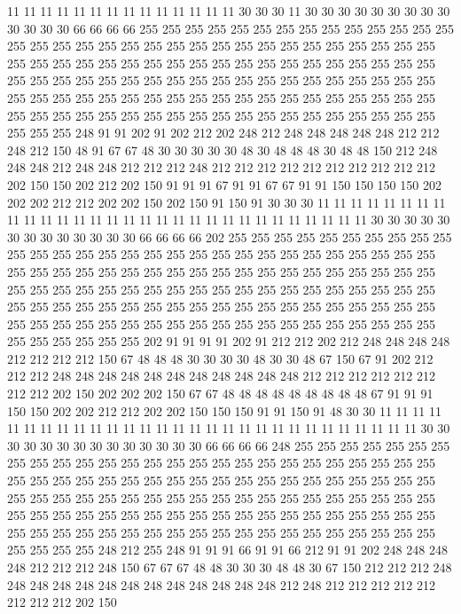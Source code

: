 11 11 11 11 11 11 11 11 11 11 11 11 11 11 30 30 30 11 30 30
30 30 30 30 30 30 30 30 30 30 30 66 66 66 66 255 255 255 255 255
255 255 255 255 255 255 255 255 255 255 255 255 255 255 255 255 255 255 255 255
255 255 255 255 255 255 255 255 255 255 255 255 255 255 255 255 255 255 255 255
255 255 255 255 255 255 255 255 255 255 255 255 255 255 255 255 255 255 255 255
255 255 255 255 255 255 255 255 255 255 255 255 255 255 255 255 255 255 255 255
255 255 255 255 255 255 255 255 255 255 255 255 255 255 255 255 255 255 255 255
255 255 255 255 255 255 255 248 91 91 202 91 202 212 202 248 212 248 248 248
248 248 212 212 248 212 150 48 91 67 67 48 30 30 30 30 30 48 30 48
48 48 30 48 48 150 212 248 248 248 212 248 248 212 212 212 248 212 212 212
212 212 212 212 212 212 212 202 150 150 202 212 202 150 91 91 91 67 91 91
67 67 91 91 150 150 150 150 202 202 202 212 212 202 202 150 202 150 91 150
91 30 30 30 11 11 11 11 11 11 11 11 11 11 11 11 11 11 11 11
11 11 11 11 11 11 11 11 11 11 11 11 11 11 30 30 30 30 30 30
30 30 30 30 30 30 30 66 66 66 66 202 255 255 255 255 255 255 255 255
255 255 255 255 255 255 255 255 255 255 255 255 255 255 255 255 255 255 255 255
255 255 255 255 255 255 255 255 255 255 255 255 255 255 255 255 255 255 255 255
255 255 255 255 255 255 255 255 255 255 255 255 255 255 255 255 255 255 255 255
255 255 255 255 255 255 255 255 255 255 255 255 255 255 255 255 255 255 255 255
255 255 255 255 255 255 255 255 255 255 255 255 255 255 255 255 255 255 255 255
255 255 255 202 91 91 91 91 202 91 212 212 202 212 248 248 248 248 212 212
212 212 150 67 48 48 48 30 30 30 30 48 30 30 48 67 150 67 91 202
212 212 212 248 248 248 248 248 248 248 248 248 248 248 212 212 212 212 212 212
212 212 202 150 202 202 202 150 67 67 48 48 48 48 48 48 48 48 48 67
91 91 91 150 150 202 202 212 212 202 202 150 150 150 91 91 150 91 48 30
30 11 11 11 11 11 11 11 11 11 11 11 11 11 11 11 11 11 11 11
11 11 11 11 11 11 11 11 11 11 30 30 30 30 30 30 30 30 30 30
30 30 30 30 66 66 66 66 248 255 255 255 255 255 255 255 255 255 255 255
255 255 255 255 255 255 255 255 255 255 255 255 255 255 255 255 255 255 255 255
255 255 255 255 255 255 255 255 255 255 255 255 255 255 255 255 255 255 255 255
255 255 255 255 255 255 255 255 255 255 255 255 255 255 255 255 255 255 255 255
255 255 255 255 255 255 255 255 255 255 255 255 255 255 255 255 255 255 255 255
255 255 255 255 255 255 255 255 255 255 255 255 255 255 255 248 212 255 248 91
91 91 66 91 91 66 212 91 91 202 248 248 248 248 212 212 212 248 150 67
67 67 48 48 30 30 30 48 48 30 67 150 212 212 212 248 248 248 248 248
248 248 248 248 248 248 248 248 212 248 212 212 212 212 212 212 212 212 202 150
